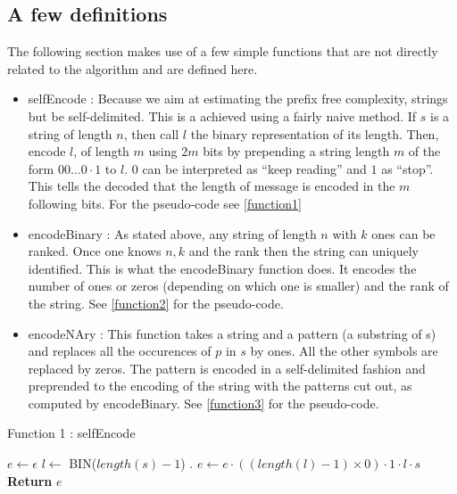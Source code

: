 \documentclass[12pt]{amsart}
\theoremstyle{definition}
\theoremstyle{remark}
\theoremstyle{definition}
\theoremstyle{remark}
\begin{document}
		\subsection*{A few definitions}

			The following section makes use of a few simple functions that are not directly related to the algorithm and are defined here. 

			\begin{itemize}
				\item selfEncode : Because we aim at estimating the prefix free complexity, strings but be self-delimited. This is a achieved using a
					fairly naive method. If $s$ is a string of length $n$, then call $l$ the binary representation of its length. Then, encode $l$, of length
					$m$ using $2m$ bits by prepending a string length $m$ of the form $00 \dots 0 \cdot 1$ to $l$. $0$ can be interpreted as ``keep reading''
					and $1$ as ``stop''. This tells the decoded that the length of message is encoded in the $m$ following bits. For the pseudo-code see \ref{function1}
				\item encodeBinary : As stated above, any string of length $n$ with $k$ ones can be ranked. Once one knows $n, k$ and the rank then the string
					can uniquely identified. This is what the encodeBinary function does. It encodes the number of ones or zeros (depending on which one is smaller) and the rank of the string. See \ref{function2} for the pseudo-code.
				\item encodeNAry : This function takes a string and a pattern (a substring of s) and replaces all the occurences of $p$ in $s$ by ones. All the
					other symbols are replaced by zeros. The pattern is encoded in a self-delimited fashion and preprended to the encoding of the string with the patterns cut out, as computed by encodeBinary. See \ref{function3} for the pseudo-code.
			\end{itemize}

			\begin{algorithm}{Function 1 : selfEncode}{
				\label{function1}
				}
			\begin{algorithmic}
					\State $ e \gets \epsilon$ 
					\State $ l \gets $ BIN($length(s) - 1$) . 
					\State $ e \gets e \cdot ((length(l) - 1) \times 0) \cdot 1 \cdot l \cdot s$
					\State \textbf{Return} $e$
				\EndFunction
			\end{algorithmic}
		\end{algorithm}
	
\end{document}
